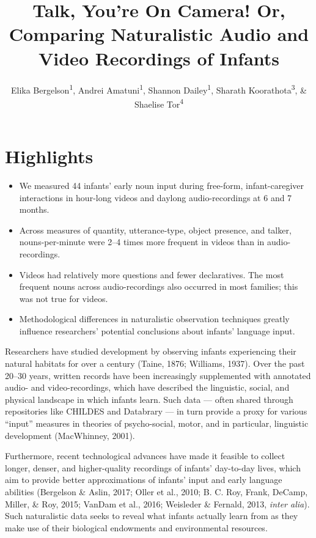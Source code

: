 \documentclass[floatsintext,man]{apa6}
\title{Talk, You're On Camera! Or, Comparing Naturalistic Audio and Video
Recordings of Infants}
\author{Elika Bergelson\textsuperscript{1}, Andrei Amatuni\textsuperscript{1}, Shannon Dailey\textsuperscript{1}, Sharath Koorathota\textsuperscript{3}, \& Shaelise Tor\textsuperscript{4}}
\affiliation{
    \vspace{0.5cm}
          \textsuperscript{1} Duke University\\
          \textsuperscript{2} University of Rochester\\
          \textsuperscript{3} Columbia University Medical Center\\
          \textsuperscript{4} Syracuse University  }
\providecommand{\tightlist}{%
  \setlength{\itemsep}{0pt}\setlength{\parskip}{0pt}}
\theoremstyle{definition}
\theoremstyle{definition}
\theoremstyle{definition}
\theoremstyle{remark}
\begin{document}
\maketitle

\setcounter{secnumdepth}{0}



\hypertarget{highlights}{%
\section{Highlights}\label{highlights}}

\begin{itemize}
\tightlist
\item
  We measured 44 infants' early noun input during free-form,
  infant-caregiver interactions in hour-long videos and daylong
  audio-recordings at 6 and 7 months.
\item
  Across measures of quantity, utterance-type, object presence, and
  talker, nouns-per-minute were 2--4 times more frequent in videos than
  in audio-recordings.
\item
  Videos had relatively more questions and fewer declaratives. The most
  frequent nouns across audio-recordings also occurred in most families;
  this was not true for videos.
\item
  Methodological differences in naturalistic observation techniques
  greatly influence researchers' potential conclusions about infants'
  language input.
\end{itemize}

Researchers have studied development by observing infants experiencing
their natural habitats for over a century (Taine, 1876; Williams, 1937).
Over the past 20--30 years, written records have been increasingly
supplemented with annotated audio- and video-recordings, which have
described the linguistic, social, and physical landscape in which
infants learn. Such data --- often shared through repositories like
CHILDES and Databrary --- in turn provide a proxy for various
\enquote{input} measures in theories of psycho-social, motor, and in
particular, linguistic development (MacWhinney, 2001).

Furthermore, recent technological advances have made it feasible to
collect longer, denser, and higher-quality recordings of infants'
day-to-day lives, which aim to provide better approximations of infants'
input and early language abilities (Bergelson \& Aslin, 2017; Oller et
al., 2010; B. C. Roy, Frank, DeCamp, Miller, \& Roy, 2015; VanDam et
al., 2016; Weisleder \& Fernald, 2013, \emph{inter alia}). Such
naturalistic data seeks to reveal what infants actually learn from as
they make use of their biological endowments and environmental
resources.
\end{document}
